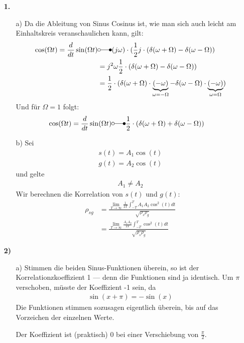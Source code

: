 \documentclass[a4paper,11pt]{article}
\author{\authorinfotitle}
\title{\titleinfo}
\date{\today}
\begin{document}
	\maketitle
	\begin{enumerate}
		\item[\textbf{1.}]
			\begin{enumerate}
				\item[a)]
				Da die Ableitung von Sinus Cosinus ist, wie man sich auch leicht am Einhaltskreis veranschaulichen kann, gilt:
				\begin{align*}
				\cos(\Omega t) = \frac{d}{dt} \sin(\Omega t) &\laplace (j\omega) \cdot (\frac{1}{2}j \cdot (\delta(\omega + \Omega) - \delta(\omega - \Omega)) \\
				&= j^2\omega\frac{1}{2} \cdot (\delta(\omega + \Omega) - \delta(\omega - \Omega)) \\
				&= \frac{1}{2} \cdot (\delta(\omega + \Omega) \cdot \underbrace{(-\omega)}_{\omega = - \Omega} - \delta(\omega - \Omega) \cdot  \underbrace{(-\omega)}_{\omega = \Omega})
				\end{align*}
				Und für $\Omega = 1$ folgt:
				\begin{align*}
				\cos(\Omega t) = \frac{d}{dt} \sin(\Omega t) &\laplace \frac{1}{2} \cdot (\delta(\omega + \Omega) + \delta(\omega - \Omega))
				\end{align*}
				\item[b)]
					Sei
					\begin{align*}
						s(t) = A_1 \cos(t) \\
						g(t) = A_2 \cos(t)
					\end{align*}
					und gelte
					\begin{align}
						A_1 \neq A_2
					\end{align}
					Wir berechnen die Korrelation von $s(t)$ und $g(t)$:
					\begin{align*}
						\rho_{sg} &= \frac{\displaystyle \lim_{T \to \infty} \frac{1}{2T} \int_{-T}^T A_1 A_2 \cos^2(t) dt}{\sqrt{\rho_s\rho_g}} \\
								  &= \frac{\displaystyle \lim_{T \to \infty} \frac{A_1A_2}{2T} \int_{-T}^T \cos^2(t) dt}{\sqrt{\rho_s\rho_g}}
					\end{align*}
			\end{enumerate}

		\item[\textbf{2)}]
			\begin{enumerate}
				\item[a)]
					Stimmen die beiden Sinus-Funktionen überein, so ist der
					Korrelationzkoeffizient 1 --- denn die Funktionen sind ja
					identisch. Um $\pi$ verschoben, müsste der Koeffizient -1
					sein, da
					\begin{align*}
					\sin(x + \pi) = -\sin(x)
					\end{align*}
					Die Funktionen stimmen sozusagen eigentlich überein,
					bis auf das Vorzeichen der einzelnen Werte.

					Der Koeffizient ist (praktisch) 0 bei einer Verschiebung
					von $\frac{\pi}{2}$.
			\end{enumerate}
	\end{enumerate}
\end{document}
